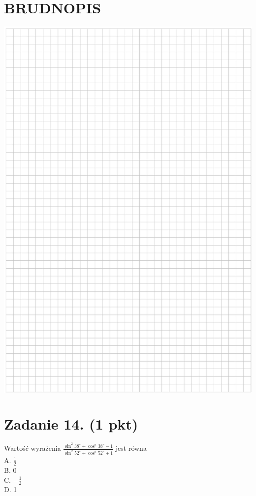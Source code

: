 \documentclass[10pt]{article}
\begin{document}
\section*{BRUDNOPIS}
\begin{center}
\includegraphics[max width=\textwidth]{2024_11_21_5b6b7ffa9006e3f448adg-05}
\end{center}

\section*{Zadanie 14. (1 pkt)}
Wartość wyrażenia \(\frac{\sin ^{2} 38^{\circ}+\cos ^{2} 38^{\circ}-1}{\sin ^{2} 52^{\circ}+\cos ^{2} 52^{\circ}+1}\) jest równa\\
A. \(\frac{1}{2}\)\\
B. 0\\
C. \(-\frac{1}{2}\)\\
D. 1
\end{document}
